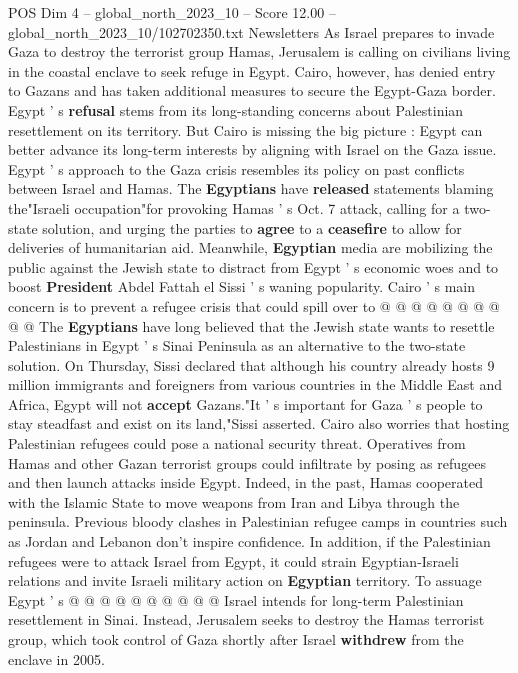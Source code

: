 \begin{textsample}{POS Dim 4 – global\_north\_2023\_10 – Score 12.00 – global\_north\_2023\_10/102702350.txt}  \label{ex:f4_pos_446}
Newsletters As Israel prepares to invade Gaza to destroy the terrorist group Hamas, Jerusalem is calling on civilians living in the coastal enclave to seek refuge in Egypt.
Cairo, however, has denied entry to Gazans and has taken additional measures to secure the Egypt-Gaza border.
Egypt ' s \textbf{refusal} stems from its long-standing concerns about Palestinian resettlement on its territory.
But Cairo is missing the big picture : Egypt can better advance its long-term interests by aligning with Israel on the Gaza issue.
Egypt ' s approach to the Gaza crisis resembles its policy on past conflicts between Israel and Hamas.
The \textbf{Egyptians} have \textbf{released} statements blaming the"Israeli occupation"for provoking Hamas ' s Oct. 7 attack, calling for a two-state solution, and urging the parties to \textbf{agree} to a \textbf{ceasefire} to allow for deliveries of humanitarian aid.
Meanwhile, \textbf{Egyptian} media are mobilizing the public against the Jewish state to distract from Egypt ' s economic woes and to boost \textbf{President} Abdel Fattah el Sissi ' s waning popularity.
Cairo ' s main concern is to prevent a refugee crisis that could spill over to @ @ @ @ @ @ @ @ @ @ The \textbf{Egyptians} have long believed that the Jewish state wants to resettle Palestinians in Egypt ' s Sinai Peninsula as an alternative to the two-state solution.
On Thursday, Sissi declared that although his country already hosts 9 million immigrants and foreigners from various countries in the Middle East and Africa, Egypt will not \textbf{accept} Gazans."It ' s important for Gaza ' s people to stay steadfast and exist on its land,"Sissi asserted.
Cairo also worries that hosting Palestinian refugees could pose a national security threat.
Operatives from Hamas and other Gazan terrorist groups could infiltrate by posing as refugees and then launch attacks inside Egypt.
Indeed, in the past, Hamas cooperated with the Islamic State to move weapons from Iran and Libya through the peninsula.
Previous bloody clashes in Palestinian refugee camps in countries such as Jordan and Lebanon don't inspire confidence.
In addition, if the Palestinian refugees were to attack Israel from Egypt, it could strain Egyptian-Israeli relations and invite Israeli military action on \textbf{Egyptian} territory.
To assuage Egypt ' s @ @ @ @ @ @ @ @ @ @ Israel intends for long-term Palestinian resettlement in Sinai.
Instead, Jerusalem seeks to destroy the Hamas terrorist group, which took control of Gaza shortly after Israel \textbf{withdrew} from the enclave in 2005.

\end{textsample}
